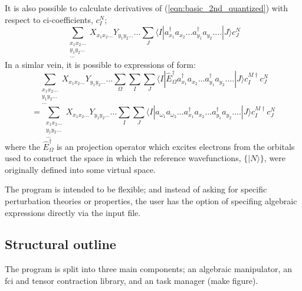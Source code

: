 \documentclass[12pt]{article}
\begin{document}
\noindent It is also possible to calculate derivatives of (\ref{eqn:basic_2nd_quantized})  with respect to ci-coefficients, $c_{I}^{N}$;
 \begin{equation}
\sum_{\substack{ x_{1}x_{2}...\\ y_{1}y_{2}... \\ ...}} X_{x_{1}x_{2}...} Y_{y_{1}y_{2}...} ...
\sum_{J}
\langle I | a^{\dagger}_{x_{1}} a_{x_{2}}...a^{\dagger}_{y_{1}}a_{y_{2}}....| J \rangle 
c^{N}_{J}
\label{eqn:ci_derivative}
\end{equation}
 \noindent In a simlar vein, it is possible to expressions of form:
\begin{equation*}
\sum_{\substack{ x_{1}x_{2}...\\ y_{1}y_{2}... \\ ...}} X_{x_{1}x_{2}...} Y_{y_{1}y_{2}...} ...
\sum_{\Omega}
\sum_{I}\sum_{J}
\langle I | \hat{E}^{\dagger}_{\Omega} a^{\dagger}_{x_{1}} a_{x_{2}}...a^{\dagger}_{y_{1}}a_{y_{2}}....| J \rangle 
 c^{M \dagger}_{I}c^{N}_{J}
\end{equation*}
\begin{equation}
=
\sum_{\substack{ x_{1}x_{2}...\\ y_{1}y_{2}... \\ ...}} X_{x_{1}x_{2}...} Y_{y_{1}y_{2}...} ...
\sum_{I}\sum_{J}
\langle I | a_{\omega_{1}} a_{\omega_{2}}.. .a^{\dagger}_{x_{1}} a_{x_{2}}...a^{\dagger}_{y_{1}}a_{y_{2}}....| J \rangle 
 c^{M \dagger}_{I}c^{N}_{J}
\label{eqn:basic_2nd_quantized_projector}
\end{equation}
 \noindent where the $\hat{E}^{\dagger}_{\Omega}$ is an projection operator which excites electrons from the orbitals used to construct the space in which the
reference wavefunctions, $\{|N\rangle\}$, were originally defined into some virtual space.

\noindent The program is intended to be flexible; and instead of asking for specific perturbation theories or properties, the user
has the option of specifing algebraic expressions directly via the input file.


\subsection{Structural outline}
\noindent The program is split into three main components; an algebraic manipulator, an fci and tensor contraction library, and an task manager (make figure).\\
\end{document}
